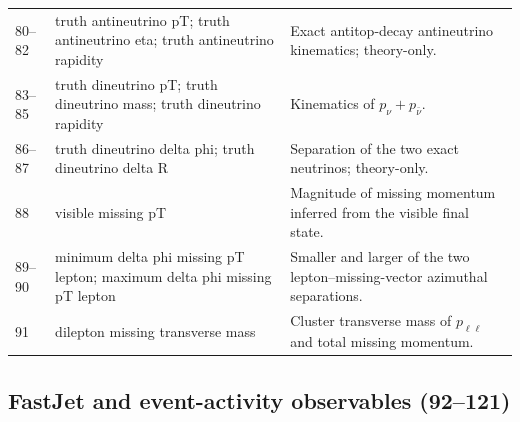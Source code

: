 \documentclass[10pt,a4paper]{article}
\newcommand{\hist}[1]{\textsf{#1}}
\begin{document}
\begin{longtable}{L{1.1cm}L{6.1cm}L{8.6cm}}
80--82 & \hist{truth antineutrino pT}; \hist{truth antineutrino eta}; \hist{truth antineutrino rapidity} & Exact antitop-decay antineutrino kinematics; theory-only.\\
83--85 & \hist{truth dineutrino pT}; \hist{truth dineutrino mass}; \hist{truth dineutrino rapidity} & Kinematics of \(p_\nu+p_{\bar\nu}\).\\
86--87 & \hist{truth dineutrino delta phi}; \hist{truth dineutrino delta R} & Separation of the two exact neutrinos; theory-only.\\
88 & \hist{visible missing pT} & Magnitude of missing momentum inferred from the visible final state.\\
89--90 & \hist{minimum delta phi missing pT lepton}; \hist{maximum delta phi missing pT lepton} & Smaller and larger of the two lepton--missing-vector azimuthal separations.\\
91 & \hist{dilepton missing transverse mass} & Cluster transverse mass of \(p_{\ell\ell}\) and total missing momentum.\\
\bottomrule
\end{longtable}

\subsection{FastJet and event-activity observables (92--121)}
\end{document}
